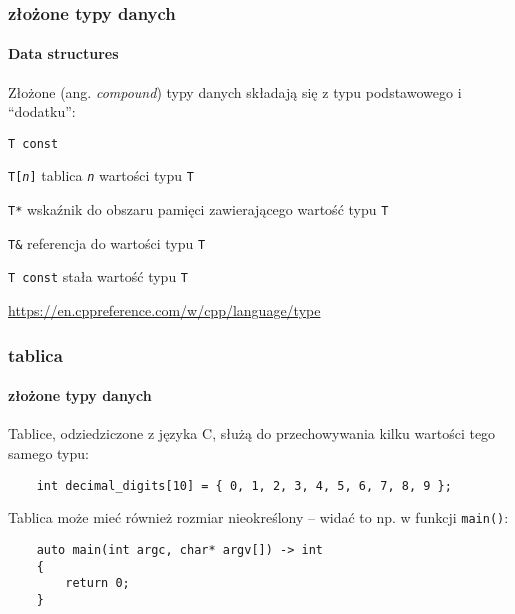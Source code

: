 \documentclass[aspectratio=169]{beamer}
\begin{document}
\begin{frame}
    \frametitle{złożone typy danych}
    \framesubtitle{Data structures}

    Złożone (ang. \emph{compound}) typy danych składają się z typu
    podstawowego i ``dodatku'':

    \begin{labeling}{{\tt T const}}
    \item[{\tt T[\emph{n}]}] tablica {\tt \emph{n}} wartości typu {\tt T}
    \item[{\tt T*}] wskaźnik do obszaru pamięci zawierającego wartość
        typu {\tt T}
    \item[{\tt T\&}] referencja do wartości typu {\tt T}
    \item[{\tt T const}] stała wartość typu {\tt T}
    \end{labeling}

    \vspace{1em}

    \url{https://en.cppreference.com/w/cpp/language/type}
\end{frame}

\begin{frame}[fragile]
    \frametitle{tablica}
    \framesubtitle{złożone typy danych}

    Tablice, odziedziczone z języka C, służą do przechowywania kilku wartości
    tego samego typu:
    {\footnotesize \begin{lstlisting}
    int decimal_digits[10] = { 0, 1, 2, 3, 4, 5, 6, 7, 8, 9 };
    \end{lstlisting}}

    Tablica może mieć również rozmiar nieokreślony -- widać to np. w funkcji
    {\tt main()}:

    {\footnotesize \begin{lstlisting}
    auto main(int argc, char* argv[]) -> int
    {
        return 0;
    }
    \end{lstlisting}}
\end{frame}
\end{document}
